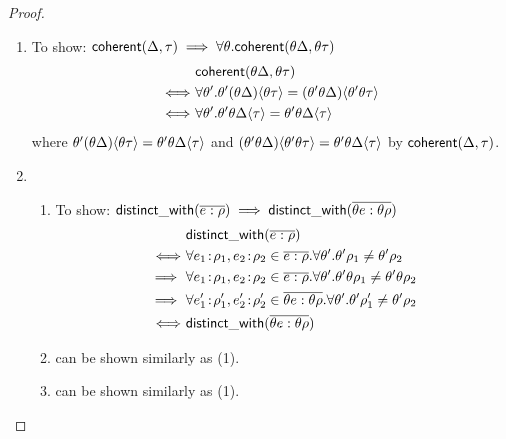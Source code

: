 \begin{proof}
\begin{enumerate}
  \item To show: ${\sf coherent}(\Delta, \tau) 
    \implies \forall \theta. {\sf coherent}(\theta \Delta, \theta \tau)$
    \begin{align*}
      & {\sf coherent}(\theta \Delta, \theta \tau) \\
      \Longleftrightarrow~ & \forall \theta'. 
      \theta' {(\theta \Delta)\langle{\theta \tau}\rangle} =
      {(\theta' \theta \Delta)\langle{\theta' \theta \tau}\rangle} \\
      \Longleftrightarrow~ & \forall \theta'. 
      \theta' \theta {\Delta\langle{\tau}\rangle} = \theta' \theta
      {\Delta\langle{\tau}\rangle}
    \end{align*}
    where $\theta' {(\theta \Delta)\langle{\theta \tau}\rangle} = \theta'
    \theta {\Delta\langle{\tau}\rangle}$ and ${(\theta' \theta
      \Delta)\langle{\theta' \theta \tau}\rangle} = \theta' \theta
    {\Delta\langle{\tau}\rangle}$ by ${\sf coherent}(\Delta, \tau)$.
  \item 
    \begin{enumerate}
    \item To show: ${\sf distinct\_with}(\overline{e:\rho}) \implies
      {\sf distinct\_with}(\overline{\theta e:\theta \rho})$
      \begin{align*}
        & \distinctwith(\rulesetexp) \\
        \eqv~ & 
        \forall \myrelation{e_1}{\rulet_1}, \myrelation{e_2}{\rulet_2}
        \in \rulesetexp. \forall \theta'. \theta' \rulet_1 \neq
        \theta' \rulet_2 \\
        \implies~ & \forall \myrelation{e_1}{\rulet_1}, \myrelation{e_2}{\rulet_2}
        \in \rulesetexp. \forall \theta'. 
        \theta' \theta \rulet_1 \neq \theta' \theta \rulet_2 \\
        \implies~ &
        \forall \myrelation{e_1'}{\rulet_1'}, \myrelation{e_2'}{\rulet_2'}
        \in \overline{\relation{\theta e}{\theta \rulet}}.
        \forall \theta'. \theta' \rulet_1' \neq \theta' \rulet_2  \\
        \eqv~ & 
        \distinctwith(\overline{\relation{\theta e}{\theta \rulet}})
      \end{align*}
    \item can be shown similarly as (1).
    \item can be shown similarly as (1).
    \end{enumerate}
  \end{enumerate}
\end{proof}


